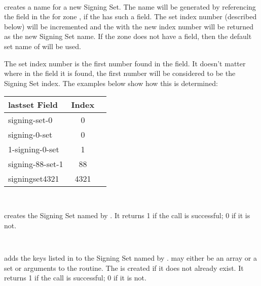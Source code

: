 \begin{description}

\item {}\verb" "

 creates a name for a new Signing Set.  The
name will be generated by referencing the  field in the
 for zone , if the  has such a
field.  The set index number (described below) will be incremented and the
 with the new index number will be returned as the new Signing
Set name.  If the zone  does not have a  field,
then the default set name of  will be used.

The set index number is the first number found in the  field.  It
doesn't matter where in the field it is found, the first number will be
considered to be the Signing Set index.  The examples below show how this is
determined:

\begin{table}[h]
\begin{center}
\begin{tabular}{|l|c|l|}
\hline
{\bf lastset Field} & {\bf Index} \\
\hline
signing-set-0    & 0	  \\
signing-0-set    & 0	  \\
1-signing-0-set  & 1	  \\
signing-88-set-1 & 88	  \\
signingset4321   & 4321	  \\
\hline
\end{tabular}
\end{center}
\end{table}

\item {}\verb" "

 creates the Signing Set named by
.  It returns 1 if the call is successful; 0 if it is
not.

\item {}\verb" "

 adds the keys listed in  to
the Signing Set named by .   may either
be an array or a set or arguments to the routine.  The  is
created if it does not already exist.  It returns 1 if the call is successful;
0 if it is not.


\end{description}
